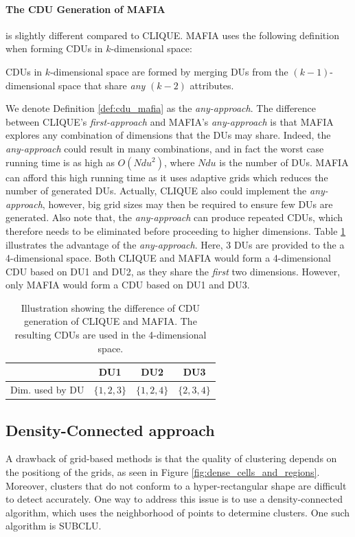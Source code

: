 \paragraph{The CDU Generation of MAFIA}
is slightly different compared to CLIQUE. MAFIA uses the following definition when forming CDUs in $k$-dimensional space:
\begin{definition}\label{def:cdu_mafia}
    CDUs in $k$-dimensional space are formed by merging DUs from the $(k-1)$-dimensional space that share \textit{any} $(k-2)$ attributes.
\end{definition}
We denote Definition \ref{def:cdu_mafia} as the \textit{any-approach}. The difference between CLIQUE's \textit{first-approach} and MAFIA's \textit{any-approach} is that MAFIA explores any combination of dimensions that the DUs may share. Indeed, the \textit{any-approach} could result in many combinations, and in fact the worst case running time is as high as $O(Ndu^2)$, where $Ndu$ is the number of DUs. MAFIA can afford this high running time as it uses adaptive grids which reduces the number of generated DUs. Actually, CLIQUE also could implement the \textit{any-approach}, however, big grid sizes may then be required to ensure few DUs are generated. Also note that, the \textit{any-approach} can produce repeated CDUs, which therefore needs to be eliminated before proceeding to higher dimensions. Table \ref{tab:cdu} illustrates the advantage of the \textit{any-approach}. Here, 3 DUs are provided to the a 4-dimensional space. Both CLIQUE and MAFIA would form a 4-dimensional CDU based on DU1 and DU2, as they share the \textit{first} two dimensions. However, only MAFIA would form a CDU based on DU1 and DU3.
\begin{table}[H]
    \vspace*{-0.7cm}
    \centering
    \begin{tabular}{l|c|c|c|}
                        & DU1           & DU2           & DU3           \\ \hline
        Dim. used by DU & $\{1, 2, 3\}$ & $\{1, 2, 4\}$ & $\{2, 3, 4\}$ \\
    \end{tabular}
    \vspace*{0.2cm}
    \caption{Illustration showing the difference of CDU generation of CLIQUE and MAFIA. The resulting CDUs are used in the 4-dimensional space.}
    \label{tab:cdu}
    \vspace*{-0.7cm}
\end{table}

\subsection{Density-Connected approach}
A drawback of grid-based methods is that the quality of clustering depends on the positiong of the grids, as seen in Figure \ref{fig:dense_cells_and_regions}. Moreover, clusters that do not conform to a hyper-rectangular shape are difficult to detect accurately. One way to address this issue is to use a density-connected algorithm, which uses the neighborhood of points to determine clusters. One such algorithm is SUBCLU.


